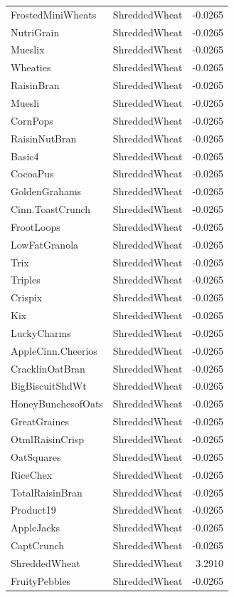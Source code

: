 \begin{longtable}{llr}
FrostedMiniWheats & ShreddedWheat & -0.0265 \\
NutriGrain & ShreddedWheat & -0.0265 \\
Mueslix & ShreddedWheat & -0.0265 \\
Wheaties & ShreddedWheat & -0.0265 \\
RaisinBran & ShreddedWheat & -0.0265 \\
Muesli & ShreddedWheat & -0.0265 \\
CornPops & ShreddedWheat & -0.0265 \\
RaisinNutBran & ShreddedWheat & -0.0265 \\
Basic4 & ShreddedWheat & -0.0265 \\
CocoaPus & ShreddedWheat & -0.0265 \\
GoldenGrahams & ShreddedWheat & -0.0265 \\
Cinn.ToastCrunch & ShreddedWheat & -0.0265 \\
FrootLoops & ShreddedWheat & -0.0265 \\
LowFatGranola & ShreddedWheat & -0.0265 \\
Trix & ShreddedWheat & -0.0265 \\
Triples & ShreddedWheat & -0.0265 \\
Crispix & ShreddedWheat & -0.0265 \\
Kix & ShreddedWheat & -0.0265 \\
LuckyCharms & ShreddedWheat & -0.0265 \\
AppleCinn.Cheerios & ShreddedWheat & -0.0265 \\
CracklinOatBran & ShreddedWheat & -0.0265 \\
BigBiscuitShdWt & ShreddedWheat & -0.0265 \\
HoneyBunchesofOats & ShreddedWheat & -0.0265 \\
GreatGraines & ShreddedWheat & -0.0265 \\
OtmlRaisinCrisp & ShreddedWheat & -0.0265 \\
OatSquares & ShreddedWheat & -0.0265 \\
RiceChex & ShreddedWheat & -0.0265 \\
TotalRaisinBran & ShreddedWheat & -0.0265 \\
Product19 & ShreddedWheat & -0.0265 \\
AppleJacks & ShreddedWheat & -0.0265 \\
CaptCrunch & ShreddedWheat & -0.0265 \\
ShreddedWheat & ShreddedWheat & 3.2910 \\
FruityPebbles & ShreddedWheat & -0.0265 \\

\end{longtable}
